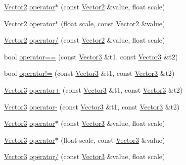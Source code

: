 \begin{DoxyCompactItemize}
\item 
\mbox{\hyperlink{struct_math_1_1_vector2}{Vector2}} \mbox{\hyperlink{namespace_math_a9071831f1488bc75d0dff29a52258009}{operator$\ast$}} (const \mbox{\hyperlink{struct_math_1_1_vector2}{Vector2}} \&value, float scale)
\item 
\mbox{\hyperlink{struct_math_1_1_vector2}{Vector2}} \mbox{\hyperlink{namespace_math_ae64567d7ee2881978a228a6ceaeca4f4}{operator$\ast$}} (float scale, const \mbox{\hyperlink{struct_math_1_1_vector2}{Vector2}} \&value)
\item 
\mbox{\hyperlink{struct_math_1_1_vector2}{Vector2}} \mbox{\hyperlink{namespace_math_ac1d2e4f5c5d22414afbcdc056e957318}{operator/}} (const \mbox{\hyperlink{struct_math_1_1_vector2}{Vector2}} \&value, float scale)
\item 
bool \mbox{\hyperlink{namespace_math_a68e85675a519a429e4e5650bb2613bc0}{operator==}} (const \mbox{\hyperlink{struct_math_1_1_vector3}{Vector3}} \&t1, const \mbox{\hyperlink{struct_math_1_1_vector3}{Vector3}} \&t2)
\item 
bool \mbox{\hyperlink{namespace_math_acd6ae74465b9e93459c15a638efcdb61}{operator!=}} (const \mbox{\hyperlink{struct_math_1_1_vector3}{Vector3}} \&t1, const \mbox{\hyperlink{struct_math_1_1_vector3}{Vector3}} \&t2)
\item 
\mbox{\hyperlink{struct_math_1_1_vector3}{Vector3}} \mbox{\hyperlink{namespace_math_a279c2ff1375f08332e47f665f9d96622}{operator+}} (const \mbox{\hyperlink{struct_math_1_1_vector3}{Vector3}} \&t1, const \mbox{\hyperlink{struct_math_1_1_vector3}{Vector3}} \&t2)
\item 
\mbox{\hyperlink{struct_math_1_1_vector3}{Vector3}} \mbox{\hyperlink{namespace_math_a99d6a8ff14fa83d33520f7f3f717877c}{operator-\/}} (const \mbox{\hyperlink{struct_math_1_1_vector3}{Vector3}} \&t1, const \mbox{\hyperlink{struct_math_1_1_vector3}{Vector3}} \&t2)
\item 
\mbox{\hyperlink{struct_math_1_1_vector3}{Vector3}} \mbox{\hyperlink{namespace_math_a94042de53627e5809c4676b6c5340963}{operator$\ast$}} (const \mbox{\hyperlink{struct_math_1_1_vector3}{Vector3}} \&value, float scale)
\item 
\mbox{\hyperlink{struct_math_1_1_vector3}{Vector3}} \mbox{\hyperlink{namespace_math_a0d1f5fd771b09fb7d2c8e0ebbc182f19}{operator$\ast$}} (float scale, const \mbox{\hyperlink{struct_math_1_1_vector3}{Vector3}} \&value)
\item 
\mbox{\hyperlink{struct_math_1_1_vector3}{Vector3}} \mbox{\hyperlink{namespace_math_a47b5ce1ab6c1fd8b4163dbe17fc2c8bc}{operator/}} (const \mbox{\hyperlink{struct_math_1_1_vector3}{Vector3}} \&value, float scale)

\end{DoxyCompactItemize}
